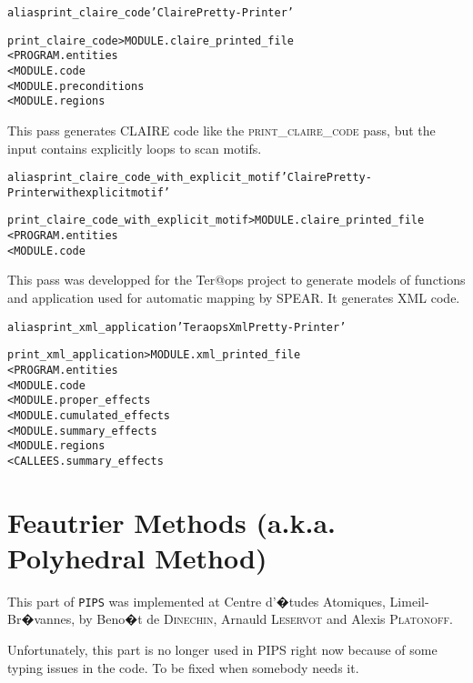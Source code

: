 \documentclass[a4paper]{report}
\newenvironment{PipsMake}{\begin{alltt}}{\end{alltt}}
\newenvironment{PipsPass}[1]{\label{pass:#1}}{}
\newcommand{\Pips}{\texttt{PIPS}}
\begin{document}
\begin{PipsMake}
alias print_claire_code 'Claire Pretty-Printer'

print_claire_code        > MODULE.claire_printed_file
        < PROGRAM.entities
        < MODULE.code
        < MODULE.preconditions
        < MODULE.regions
\end{PipsMake}


\begin{PipsPass}{print_claire_code_with_explicit_motif}
This pass generates CLAIRE code like the \textsc{print\_claire\_code}
pass, but the input contains explicitly loops to scan motifs.
\end{PipsPass}

\begin{PipsMake}
alias print_claire_code_with_explicit_motif 'Claire Pretty-Printer with explicit motif'

print_claire_code_with_explicit_motif       > MODULE.claire_printed_file
        < PROGRAM.entities
        < MODULE.code
\end{PipsMake}


\begin{PipsPass}{print_xml_application}
This pass was developped for the Ter@ops project to generate models
of functions and application used for automatic mapping by SPEAR.
It generates XML code.
\end{PipsPass}

\begin{PipsMake}
alias print_xml_application 'Teraops Xml Pretty-Printer'

print_xml_application      > MODULE.xml_printed_file
    < PROGRAM.entities
    < MODULE.code
    < MODULE.proper_effects
    < MODULE.cumulated_effects
    < MODULE.summary_effects
    < MODULE.regions
    < CALLEES.summary_effects
\end{PipsMake}

\chapter{Feautrier Methods (a.k.a. Polyhedral Method)}
\label{section-feautrier-methods}

This part of \Pips{} was implemented at Centre d'�tudes Atomiques,
Limeil-Br�vannes, by Beno�t de \textsc{Dinechin}, Arnauld
\textsc{Leservot} and Alexis \textsc{Platonoff}.

Unfortunately, this part is no longer used in PIPS right now because of
some typing issues in the code. To be fixed when somebody needs it.
\end{document}
